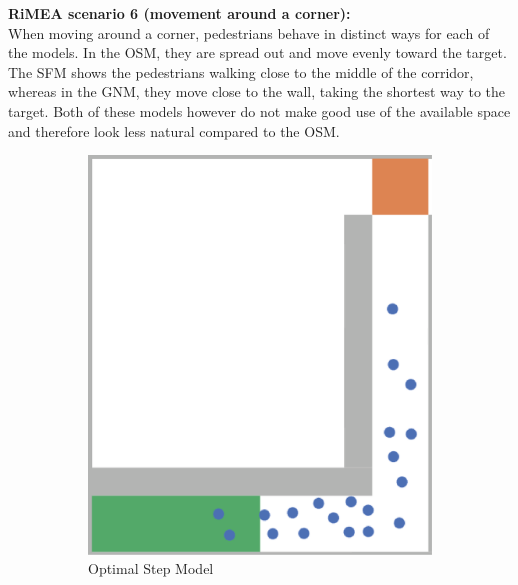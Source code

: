 \textbf{RiMEA scenario 6 (movement around a corner):}\\
When moving around a corner, pedestrians behave in distinct ways for each of the models. In the OSM, they are spread out and move evenly toward the target. The SFM shows the pedestrians walking close to the middle of the corridor, whereas in the GNM, they move close to the wall, taking the shortest way to the target. Both of these models however do not make good use of the available space and therefore look less natural compared to the OSM. 

\begin{figure}[H]
 \centering
 \begin{subfigure}[b]{0.3\textwidth}
     \centering
     \includegraphics[width=\textwidth]{images/2-osm-rimea6.png}
    \caption{Optimal Step Model}
    \label{fig: rimea6-osm}
 \end{subfigure}
 \begin{subfigure}[b]{0.3\textwidth}
      \centering

\end{subfigure}
\end{figure}
